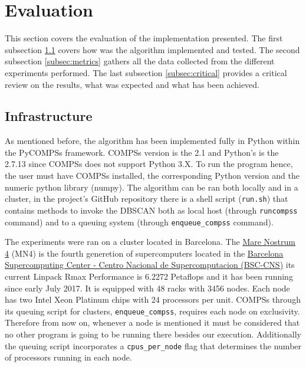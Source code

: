 \documentclass[10pt,journal,compsoc]{IEEEtran}
\begin{document}


\section{Evaluation} \label{sec:performance}


This section covers the evaluation of the implementation presented. The first subsection \ref{subsec:infrastructure} covers how was the algorithm implemented and tested. The second subsection \ref{subsec:metrics} gathers all the data collected from the different experiments performed. The last subsection \ref{subsec:critical} provides a critical review on the results, what was expected and what has been achieved.

\subsection{Infrastructure} \label{subsec:infrastructure}

As mentioned before, the algorithm has been implemented fully in Python within the PyCOMPSs framework. COMPSs version is the 2.1 and Python's is the 2.7.13 since COMPSs does not support Python 3.X. To run the program hence, the user must have COMPSs installed, the corresponding Python version and the numeric python library (numpy). The algorithm can be ran both locally and in a cluster, in the project's GitHub repository there is a shell script (\texttt{run.sh}) that contains methods to invoke the DBSCAN both as local host (through \texttt{runcompss} command) and to a queuing system (through \texttt{enqueue\_compss} command). 

The experiments were ran on a cluster located in Barcelona. The \href{https://www.bsc.es/user-support/mn4.php#systemoverview}{Mare Nostrum 4} (MN4) is the fourth generetion of supercomputers located in the \href{https://www.bsc.es}{Barcelona Supercomputing Center - Centro Nacional de Supercomputacion (BSC-CNS)} its current Linpack Rmax Performance is 6.2272 Petaflops and it has been running since early July 2017. It is equipped with 48 racks with 3456 nodes. Each node has two Intel Xeon Platinum chips with 24 processors per unit. COMPSs through its queuing script for clusters, \texttt{enqueue\_compss}, requires each node on exclusivity. Therefore from now on, whenever a node is mentioned it must be considered that no other program is going to be running there besides our execution. Additionally the queuing script incorporates a \texttt{cpus\_per\_node} flag that determines the number of processors running in each node.
\end{document}

